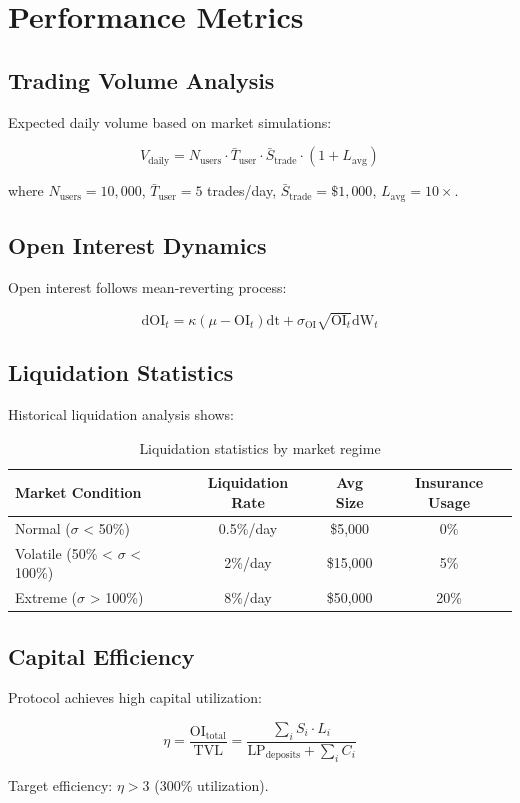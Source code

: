 \section{Performance Metrics}


\subsection{Trading Volume Analysis}

Expected daily volume based on market simulations:

\begin{equation}
V_{\text{daily}} = N_{\text{users}} \cdot \bar{T}_{\text{user}} \cdot \bar{S}_{\text{trade}} \cdot (1 + L_{\text{avg}})
\end{equation}

where $N_{\text{users}} = 10,000$, $\bar{T}_{\text{user}} = 5$ trades/day, $\bar{S}_{\text{trade}} = \$1,000$, $L_{\text{avg}} = 10\times$.

\subsection{Open Interest Dynamics}

Open interest follows mean-reverting process:

\begin{equation}
\text{dOI}_t = \kappa(\mu - \text{OI}_t)\text{dt} + \sigma_{\text{OI}}\sqrt{\text{OI}_t}\text{dW}_t
\end{equation}

\subsection{Liquidation Statistics}

Historical liquidation analysis shows:

\begin{table}[h]
\centering
\begin{tabular}{|l|c|c|c|}
\hline
\textbf{Market Condition} & \textbf{Liquidation Rate} & \textbf{Avg Size} & \textbf{Insurance Usage} \\
\hline
Normal ($\sigma$ < 50\%) & 0.5\%/day & \$5,000 & 0\% \\
Volatile (50\% < $\sigma$ < 100\%) & 2\%/day & \$15,000 & 5\% \\
Extreme ($\sigma$ > 100\%) & 8\%/day & \$50,000 & 20\% \\
\hline
\end{tabular}
\caption{Liquidation statistics by market regime}
\end{table}

\subsection{Capital Efficiency}

Protocol achieves high capital utilization:

\begin{equation}
\eta = \frac{\text{OI}_{\text{total}}}{\text{TVL}} = \frac{\sum_i S_i \cdot L_i}{\text{LP}_{\text{deposits}} + \sum_i C_i}
\end{equation}

Target efficiency: $\eta > 3$ (300\% utilization).

